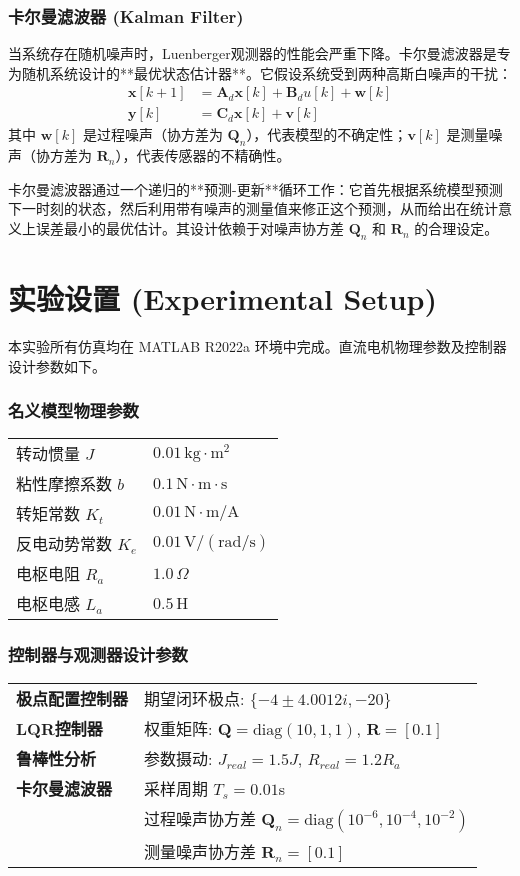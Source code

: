 \documentclass[12pt, a4paper]{article}
\begin{document}
\subsubsection{卡尔曼滤波器 (Kalman Filter)}
当系统存在随机噪声时，Luenberger观测器的性能会严重下降。卡尔曼滤波器是专为随机系统设计的**最优状态估计器**。它假设系统受到两种高斯白噪声的干扰：
\begin{align}
    \bm{x}[k+1] &= \bm{A}_d \bm{x}[k] + \bm{B}_d u[k] + \bm{w}[k] \label{eq:kalman_state} \\
    \bm{y}[k] &= \bm{C}_d \bm{x}[k] + \bm{v}[k] \label{eq:kalman_obs}
\end{align}
其中 $\bm{w}[k]$ 是过程噪声（协方差为 $\bm{Q}_n$），代表模型的不确定性；$\bm{v}[k]$ 是测量噪声（协方差为 $\bm{R}_n$），代表传感器的不精确性。

卡尔曼滤波器通过一个递归的**预测-更新**循环工作：它首先根据系统模型预测下一时刻的状态，然后利用带有噪声的测量值来修正这个预测，从而给出在统计意义上误差最小的最优估计。其设计依赖于对噪声协方差 $\bm{Q}_n$ 和 $\bm{R}_n$ 的合理设定。

\section{实验设置 (Experimental Setup)}
本实验所有仿真均在 MATLAB R2022a 环境中完成。直流电机物理参数及控制器设计参数如下。

\subsubsection*{名义模型物理参数}
\begin{tabular}{@{}ll}
    转动惯量 $J$ & $0.01 \, \mathrm{kg \cdot m^2}$ \\
    粘性摩擦系数 $b$ & $0.1 \, \mathrm{N \cdot m \cdot s}$ \\
    转矩常数 $K_t$ & $0.01 \, \mathrm{N \cdot m / A}$ \\
    反电动势常数 $K_e$ & $0.01 \, \mathrm{V / (rad/s)}$ \\
    电枢电阻 $R_a$ & $1.0 \, \Omega$ \\
    电枢电感 $L_a$ & $0.5 \, \mathrm{H}$ \\
\end{tabular}

\subsubsection*{控制器与观测器设计参数}
\begin{tabular}{@{}ll}
    \textbf{极点配置控制器} & 期望闭环极点: $\{-4 \pm 4.0012i, -20\}$ \\
    \textbf{LQR控制器} & 权重矩阵: $\bm{Q} = \mathrm{diag}(10, 1, 1)$, $\bm{R} = [0.1]$ \\
    \textbf{鲁棒性分析} & 参数摄动: $J_{real} = 1.5 J$, $R_{real} = 1.2 R_a$ \\
    \textbf{卡尔曼滤波器} & 采样周期 $T_s=0.01$s \\
    & 过程噪声协方差 $\bm{Q}_n=\mathrm{diag}(10^{-6}, 10^{-4}, 10^{-2})$ \\
    & 测量噪声协方差 $\bm{R}_n=[0.1]$ \\
\end{tabular}
\end{document}
